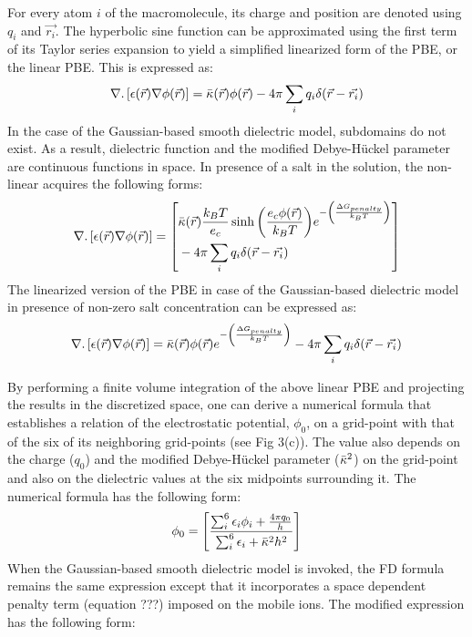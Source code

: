 \documentclass[9pt,tutorial]{livecoms}
\begin{document}
For every atom $ i $ of the macromolecule, its charge and position are denoted using $ q_i $ and $ \Vec{r_i}$. The hyperbolic sine function can be approximated using the first term of its Taylor series expansion to yield a simplified linearized form of the PBE, or the linear PBE. This is expressed as:
\begin{equation}
\nabla . \left[ \epsilon(\Vec{r})\nabla\phi(\Vec{r})\right] = \Bar{\kappa}(\Vec{r})\phi(\Vec{r}) - 4\pi\sum_{i} {q_i \delta(\Vec{r} - \Vec{r_i})}
\end{equation}
In the case of the Gaussian-based smooth dielectric model, subdomains do not exist. As a result,  dielectric function and the modified Debye-Hückel parameter are continuous functions in space. In presence of a salt in the solution, the non-linear acquires the following forms:
\begin{equation}
\nabla.\left[\epsilon(\Vec{r})\nabla\phi(\Vec{r})\right] = \left[
    \begin{aligned}
    & \Bar{\kappa}(\Vec{r})\frac{k_BT}{e_c}\sinh{\left(\frac{e_c\phi(\Vec{r})}{k_BT}\right)}e^{-\left(\frac{\Delta G_{penalty}}{k_BT} \right)} \\
    &- 4\pi\sum_{i} {q_i \delta(\Vec{r} - \Vec{r_i})}
\end{aligned}
\right]
\end{equation}
The linearized version of the PBE in case of the Gaussian-based dielectric model in presence of non-zero salt concentration can be expressed as:
\begin{equation}
\nabla . \left[ \epsilon(\Vec{r})\nabla\phi(\Vec{r})\right] = \Bar{\kappa}(\Vec{r})\phi(\Vec{r})e^{-\left(\frac{\Delta G_{penalty}}{k_BT} \right)} - 4\pi\sum_{i} {q_i \delta(\Vec{r} - \Vec{r_i})}
\end{equation}

By performing a finite volume integration of the above linear PBE and projecting the results in the discretized space, one can derive a numerical formula that establishes a relation of the electrostatic potential, $ \phi_0 $, on a grid-point with that of the six of its neighboring grid-points (see Fig 3(c)). The value also depends on the charge ($ q_0 $) and the modified Debye-Hückel parameter ($ \Bar{\kappa}^2 $) on the grid-point and also on the dielectric values at the six midpoints surrounding it. The numerical formula has the following form:
\begin{equation}
    \phi_0 = 
    \left[ 
        \frac{\sum_i^6{\epsilon_i\phi_i } + 
                \frac{4\pi q_0}{h}
             }
             {\sum_i^6{\epsilon_i} + \Bar{\kappa}^2h^2}
    \right]
\end{equation}
When the Gaussian-based smooth dielectric model is invoked, the FD formula remains the same expression except that it incorporates a space dependent penalty term (equation ???) imposed on the mobile ions. The modified expression has the following form:
\end{document}
